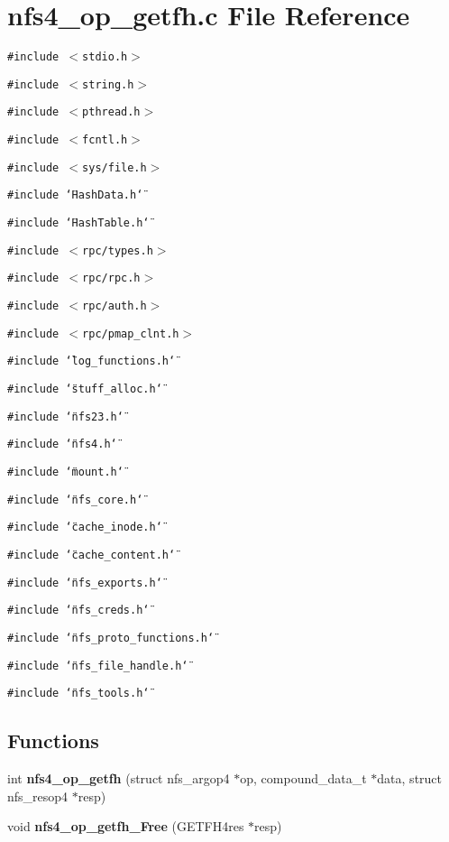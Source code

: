 \section{nfs4\_\-op\_\-getfh.c File Reference}
\label{nfs4__op__getfh_8c}
{\tt \#include $<$stdio.h$>$}\par
{\tt \#include $<$string.h$>$}\par
{\tt \#include $<$pthread.h$>$}\par
{\tt \#include $<$fcntl.h$>$}\par
{\tt \#include $<$sys/file.h$>$}\par
{\tt \#include \char`\"{}Hash\-Data.h\char`\"{}}\par
{\tt \#include \char`\"{}Hash\-Table.h\char`\"{}}\par
{\tt \#include $<$rpc/types.h$>$}\par
{\tt \#include $<$rpc/rpc.h$>$}\par
{\tt \#include $<$rpc/auth.h$>$}\par
{\tt \#include $<$rpc/pmap\_\-clnt.h$>$}\par
{\tt \#include \char`\"{}log\_\-functions.h\char`\"{}}\par
{\tt \#include \char`\"{}stuff\_\-alloc.h\char`\"{}}\par
{\tt \#include \char`\"{}nfs23.h\char`\"{}}\par
{\tt \#include \char`\"{}nfs4.h\char`\"{}}\par
{\tt \#include \char`\"{}mount.h\char`\"{}}\par
{\tt \#include \char`\"{}nfs\_\-core.h\char`\"{}}\par
{\tt \#include \char`\"{}cache\_\-inode.h\char`\"{}}\par
{\tt \#include \char`\"{}cache\_\-content.h\char`\"{}}\par
{\tt \#include \char`\"{}nfs\_\-exports.h\char`\"{}}\par
{\tt \#include \char`\"{}nfs\_\-creds.h\char`\"{}}\par
{\tt \#include \char`\"{}nfs\_\-proto\_\-functions.h\char`\"{}}\par
{\tt \#include \char`\"{}nfs\_\-file\_\-handle.h\char`\"{}}\par
{\tt \#include \char`\"{}nfs\_\-tools.h\char`\"{}}\par
\subsection*{Functions}
\begin{CompactItemize}
\item 
int {\bf nfs4\_\-op\_\-getfh} (struct nfs\_\-argop4 $\ast$op, compound\_\-data\_\-t $\ast$data, struct nfs\_\-resop4 $\ast$resp)
\item 
void {\bf nfs4\_\-op\_\-getfh\_\-Free} (GETFH4res $\ast$resp)
\end{CompactItemize}



